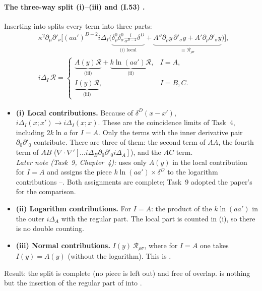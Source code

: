 \paragraph{The three-way split (i)--(iii) and (I.53) \tC.}
Inserting  into  splits every term into three parts:
\begin{equation}
\begin{aligned}
&\kappa^2\partial_\mu\partial'_\nu\Big[(aa')^{D-2}i\Delta_I\Big(\underbrace{\delta^0_\rho\delta^0_\sigma\tfrac{i}{a^{D-2}}\delta^D}_{\text{(i) local}}
+\underbrace{A''\partial_\rho y\,\partial'_\sigma y+A'\partial_\rho\partial'_\sigma y}_{\equiv\mathcal R_{\rho\sigma}}\Big)\Big],\\[4pt]
&i\Delta_I\,\mathcal R=\begin{cases}\underbrace{A(y)\mathcal R}_{\text{(iii)}}+\underbrace{k\ln(aa')\mathcal R}_{\text{(ii)}},& I=A,\\[2pt] \underbrace{I(y)\mathcal R}_{\text{(iii)}},& I=B,C.\end{cases}
\end{aligned}
\label{eq:ch3-split}
\end{equation}
\begin{itemize}[leftmargin=14pt]
\item \textbf{(i) Local contributions.} Because of $\delta^D(x-x')$, $i\Delta_I(x;x')\to i\Delta_I(x;x)$. These are the coincidence limits of Task~4, including $2k\ln a$ for
$I=A$. Only the terms with the inner derivative pair $\partial_0\partial'_0$ contribute. There are three of them: the second term of $AA$, the fourth term of $AB$
($\nabla\!\cdot\!\nabla'[\ldots i\Delta_B\partial_0\partial'_0i\Delta_A]$), and the $AC$ term.\\
\emph{Later note (Task~9, Chapter~4):} \PI{} uses only $A(y)$ in the local contribution for $I=A$ and assigns the piece $k\ln(aa')\times\delta^D$ to the
logarithm contributions --. Both assignments are complete; Task~9 adopted the paper's for the comparison.
\item \textbf{(ii) Logarithm contributions.} For $I=A$: the product of the $k\ln(aa')$ in the outer $i\Delta_A$ with the regular part. The local part is counted in (i), so there is no double counting.
\item \textbf{(iii) Normal contributions.} $I(y)\,\mathcal R_{\rho\sigma}$, where for $I=A$ one takes $I(y)=A(y)$ (without the logarithm). This is  \chIIIok.
\end{itemize}
Result: the split is complete (no piece is left out) and free of overlap.  is nothing but the insertion of the regular part of  into .

